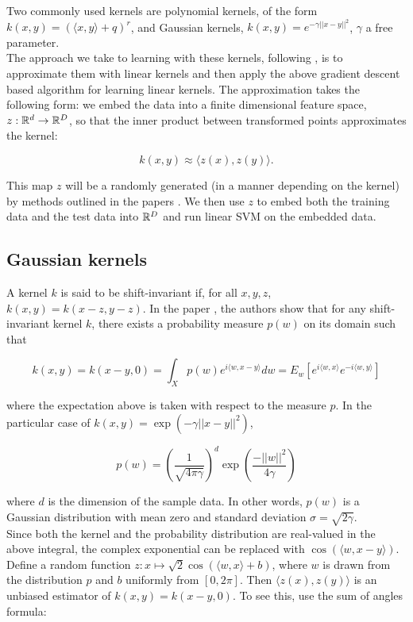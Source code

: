 Two commonly used kernels are polynomial kernels, of the form $k(x,y) = (\langle
x,y\rangle +q)^r$, and Gaussian kernels, $k(x,y) = e^{-\gamma||x-y||^2}$,
$\gamma$ a free parameter.\\

The approach we take to learning with these kernels, following \cite{RR07}, is
to approximate them with linear kernels and then apply the above gradient
descent based algorithm for learning linear kernels. The approximation takes the
following form: we embed the data into a finite dimensional feature space,
$z:\mathbb{R}^d\to \mathbb{R}^D$, so that the inner product between transformed points
approximates the kernel:

\[ k(x,y) \approx \langle z(x), z(y)\rangle.\]

This map $z$ will be a randomly generated (in a manner depending on the kernel)
by methods outlined in the papers \cite{KK12,RR07}. We then use $z$ to embed
both the training data and the test data into $\mathbb{R}^D$ and run linear SVM on the
embedded data.\\

\subsection{Gaussian kernels}

A kernel $k$ is said to be shift-invariant if, for all $x,y,z$, $k(x,y) =
k(x-z,y-z)$. In the paper \cite{RR07}, the authors show that for any shift-
invariant kernel $k$, there exists a probability measure $p(w)$ on its domain
such that

\[ k(x,y) = k(x-y,0) = \int_X p(w)e^{i\langle w, x-y\rangle} dw = E_w[e^{i\langle w,x\rangle}e^{-i\langle w,y\rangle}]
\]

where the expectation above is taken with respect to the measure $p$. In the
particular case of $k(x,y) = \exp(-\gamma||x-y||^2)$,

\[ p(w) = \left(\dfrac{1}{\sqrt{4\pi\gamma}}\right)^d \exp\left(\frac{-||w||^2}{4\gamma}\right)\]

where $d$ is the dimension of the sample data. In other words, $p(w)$ is a
Gaussian distribution with mean zero and standard deviation
$\sigma = \sqrt{2\gamma}$.\\

Since both the kernel and the probability distribution are real-valued in the
above integral, the complex exponential can be replaced with
$\cos(\langle w, x-y\rangle)$. Define a random function
$z: x\mapsto \sqrt{2}\cos(\langle w,x\rangle + b)$,
where $w$ is drawn from the distribution $p$ and $b$ uniformly
from $[0,2\pi]$. Then $\langle z(x),z(y)\rangle$ is an unbiased estimator of
$k(x,y)=k(x-y,0)$. To see this, use the sum of angles formula:

